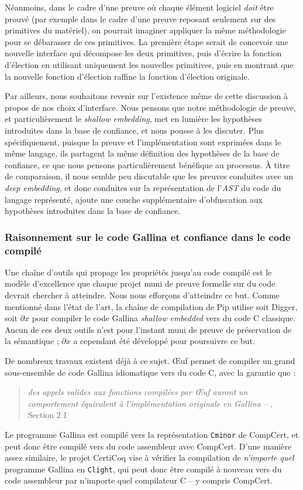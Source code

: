 Néanmoins, dans le cadre d'une preuve où chaque élément logiciel \emph{doit} être prouvé (par exemple dans le cadre d'une preuve reposant seulement sur des primitives du matériel), on pourrait imaginer appliquer la même méthodologie pour se débarasser de ces primitives. La première étape serait de concevoir une nouvelle interface qui décompose les deux primitives, puis d'écrire la fonction d'élection en utilisant uniquement les nouvelles primitives, puis en montrant que la nouvelle fonction d'élection raffine la fonction d'élection originale.

Par ailleurs, nous souhaitons revenir sur l'existence même de cette discussion à propos de nos choix d'interface. Nous pensons que notre méthodologie de preuve, et particulièrement le \emph{shallow embedding}, met en lumière les hypothèses introduites dans la base de confiance, et nous pousse à les discuter. Plus spécifiquement, puisque la preuve et l'implémentation sont exprimées dans le même langage, ils partagent la même définition des hypothèses de la base de confiance, ce que nous pensons particulièrement bénéfique au processus. À titre de comparaison, il nous semble peu discutable que les preuves conduites avec un \emph{deep embedding}, et donc conduites sur la représentation de l'\emph{AST} du code du langage représenté, ajoute une couche supplémentaire d'obfuscation aux hypothèses introduites dans la base de confiance.

\subsubsection{Raisonnement sur le code Gallina et confiance dans le code compilé}

Une chaîne d'outils qui propage les propriétés jusqu'au code compilé est le modèle d'excellence que chaque projet muni de preuve formelle sur du code devrait chercher à atteindre. Nous nous efforçons d'atteindre ce but. Comme mentionné dans l'état de l'art, la chaîne de compilation de Pip utilise soit Digger, soit $\partial x$ pour compiler le code Gallina \emph{shallow embedded} vers du code C classique. Aucun de ces deux outils n'est pour l'instant muni de preuve de préservation de la sémantique ; $\partial x$ a cependant été développé pour poursuivre ce but.

De nombreux travaux existent déjà à ce sujet.
Œuf \cite{oeuf} permet de compiler un grand sous-ensemble de code Gallina idiomatique vers du code C, avec la garantie que :
\begin{quote}
    \emph{des appels valides aux fonctions compilées par Œuf auront un comportement équivalent à l'implémentation originale en Gallina} -- \cite{oeuf}, Section 2.1
\end{quote}
Le programme Gallina est compilé vers la représentation \texttt{Cminor} de CompCert, et peut donc être compilé vers du code assembleur avec CompCert.
D'une manière assez similaire, le projet CertiCoq \cite{anand2017certicoq} vise à vérifier la compilation de \emph{n'importe quel} programme Gallina en \texttt{Clight}, qui peut donc être compilé à nouveau vers du code assembleur par n'importe quel compilateur C -- y compris CompCert.

